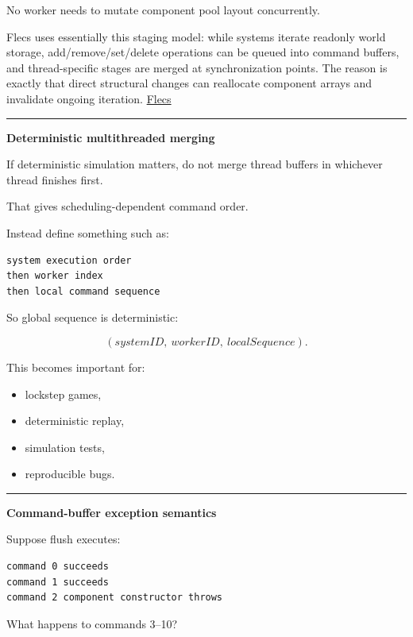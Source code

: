 No worker needs to mutate component pool layout concurrently.

Flecs uses essentially this staging model: while systems iterate readonly world storage, add/remove/set/delete operations can be queued into command buffers, and thread-specific stages are merged at synchronization points. The reason is exactly that direct structural changes can reallocate component arrays and invalidate ongoing iteration. \href{https://www.flecs.dev/flecs/Systems.html?utm_source=chatgpt.com}{Flecs}

\begin{center}\rule{0.5\linewidth}{0.5pt}\end{center}

\textbf{Deterministic multithreaded merging}

If deterministic simulation matters, do not merge thread buffers in whichever thread finishes first.

That gives scheduling-dependent command order.

Instead define something such as:

\begin{verbatim}
system execution order
then worker index
then local command sequence
\end{verbatim}

So global sequence is deterministic:

\[
(systemID,\ workerID,\ localSequence).
\]

This becomes important for:

\begin{itemize}
\tightlist
\item
  lockstep games,
\item
  deterministic replay,
\item
  simulation tests,
\item
  reproducible bugs.
\end{itemize}

\begin{center}\rule{0.5\linewidth}{0.5pt}\end{center}

\textbf{Command-buffer exception semantics}

Suppose flush executes:

\begin{verbatim}
command 0 succeeds
command 1 succeeds
command 2 component constructor throws
\end{verbatim}

What happens to commands 3--10?

